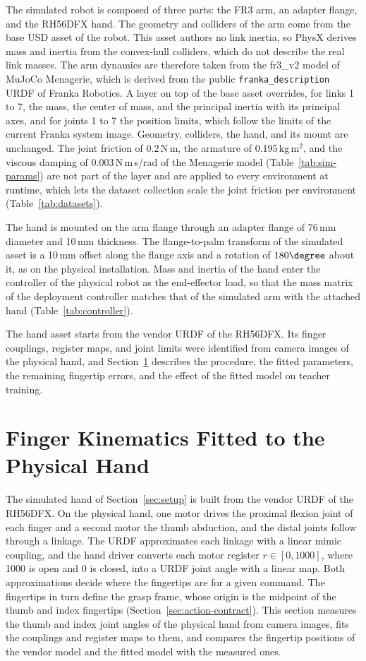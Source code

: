 The simulated robot is composed of three parts: the \acs{FR3} arm, an adapter flange, and the RH56DFX hand. The geometry and colliders of the arm come from the base USD asset of the robot. This asset authors no link inertia, so PhysX derives mass and inertia from the convex-hull colliders, which do not describe the real link masses. The arm dynamics are therefore taken from the fr3\_v2 model of MuJoCo Menagerie, which is derived from the public \texttt{franka\_description} URDF of Franka Robotics. A layer on top of the base asset overrides, for links 1 to 7, the mass, the center of mass, and the principal inertia with its principal axes, and for joints 1 to 7 the position limits, which follow the limits of the current Franka system image. Geometry, colliders, the hand, and its mount are unchanged. The joint friction of 0.2\,N\,m, the armature of 0.195\,kg\,m$^{2}$, and the viscous damping of 0.003\,N\,m\,s/rad of the Menagerie model (Table~\ref{tab:sim-params}) are not part of the layer and are applied to every environment at runtime, which lets the dataset collection scale the joint friction per environment (Table~\ref{tab:datasets}).

The hand is mounted on the arm flange through an adapter flange of 76\,mm diameter and 10\,mm thickness. The flange-to-palm transform of the simulated asset is a 10\,mm offset along the flange axis and a rotation of $180\degree$ about it, as on the physical installation. Mass and inertia of the hand enter the controller of the physical robot as the end-effector load, so that the mass matrix of the deployment controller matches that of the simulated arm with the attached hand (Table~\ref{tab:controller}).

The hand asset starts from the vendor URDF of the RH56DFX. Its finger couplings, register maps, and joint limits were identified from camera images of the physical hand, and Section~\ref{sec:app-hand} describes the procedure, the fitted parameters, the remaining fingertip errors, and the effect of the fitted model on teacher training.

\section{Finger Kinematics Fitted to the Physical Hand}\label{sec:app-hand}

The simulated hand of Section~\ref{sec:setup} is built from the vendor URDF of the RH56DFX. On the physical hand, one motor drives the proximal flexion joint of each finger and a second motor the thumb abduction, and the distal joints follow through a linkage. The URDF approximates each linkage with a linear mimic coupling, and the hand driver converts each motor register $r\in[0,1000]$, where 1000 is open and 0 is closed, into a URDF joint angle with a linear map. Both approximations decide where the fingertips are for a given command. The fingertips in turn define the grasp frame, whose origin is the midpoint of the thumb and index fingertips (Section~\ref{sec:action-contract}). This section measures the thumb and index joint angles of the physical hand from camera images, fits the couplings and register maps to them, and compares the fingertip positions of the vendor model and the fitted model with the measured ones.

